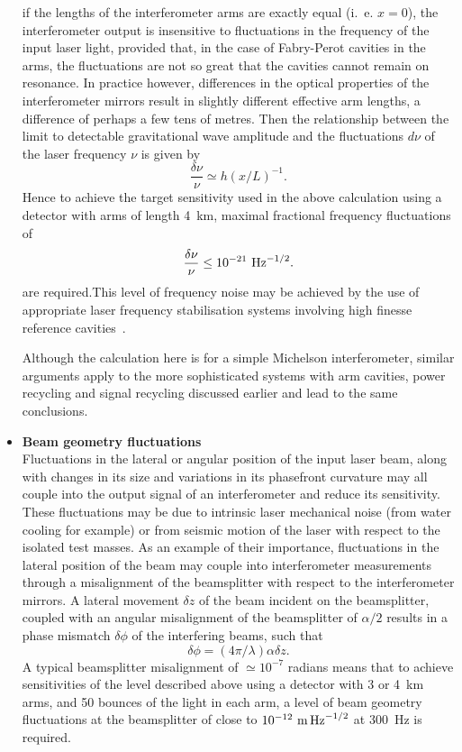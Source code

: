 \documentclass{article}
\begin{document}
\begin{itemize}
if the lengths of the interferometer arms are exactly equal (i.~e. $x = 0$),
the interferometer output is insensitive to fluctuations in the frequency of
the input laser light, provided that, in the case of Fabry-Perot cavities in
the arms, the fluctuations are not so great that the cavities cannot remain on
resonance.  In practice however, differences in the optical properties of the
interferometer mirrors result in  slightly different effective arm lengths, a
difference of perhaps a few tens of metres. Then the relationship between
the limit to detectable gravitational wave amplitude and the fluctuations
$d\nu$ of the laser frequency $\nu$ is given by~\cite{Hough}
%
\begin{equation}
  \frac{\delta \nu}{\nu} \simeq h(x/L)^{-1}.
  \label{equation:frequnoise}
\end{equation}
%
Hence to achieve the target sensitivity used in the above calculation using a
detector with arms of length 4~km, maximal fractional frequency fluctuations of
%
\begin{equation}
  \frac{\delta \nu}{\nu} \leq 10^{-21}~{\rm Hz}^{-1/2}.
  \label{equation:freqspecification}
\end{equation}
%
are required.This level of frequency noise may be achieved by the use of
appropriate laser frequency stabilisation systems involving high finesse
reference cavities~\cite{Hough}.

Although the calculation here is for a simple Michelson interferometer, similar
arguments apply to the more sophisticated systems with arm cavities, power
recycling and signal recycling discussed earlier and lead to the same
conclusions.

\item {\bf Beam geometry fluctuations} \\
Fluctuations in the lateral or angular position of the input laser beam, along
with changes in its size and variations in its phasefront curvature may all
couple into the output signal of an interferometer and reduce its sensitivity.
These fluctuations may be due to intrinsic laser mechanical noise (from water
cooling for example) or from seismic motion of the laser with respect to the
isolated test masses. As an example of their importance, fluctuations in the
lateral position of the beam may couple into interferometer measurements
through a misalignment of the beamsplitter with respect to the interferometer
mirrors. A lateral movement $\delta z$ of the beam incident on the
beamsplitter, coupled with an angular misalignment of the beamsplitter of
$\alpha/2$ results in a phase mismatch $\delta \phi$ of the interfering beams,
such that~\cite{Rudiger}
%
\begin{equation}
  \delta \phi = (4 \pi/\lambda) \alpha \delta z.
  \label{equation:beamgeomfluc}
\end{equation}
%
A typical beamsplitter misalignment of $\simeq 10^{-7}$ radians means that to
achieve sensitivities of the level described above using a detector with 3 or
4~km arms, and 50 bounces of the light in each arm, a level of beam geometry
fluctuations at the beamsplitter of close to $10^{-12}~{\rm m}\,{\rm Hz}^{-1/2}$
at 300~Hz is required.


\end{itemize}
\end{document}
